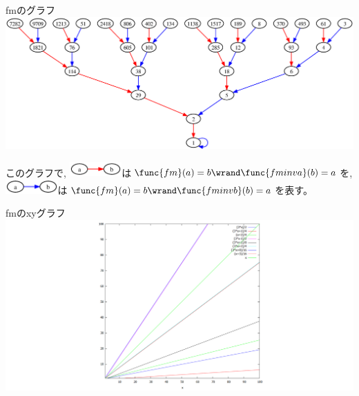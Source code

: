 \documentclass{mystyle}
\begin{document}
\begin{section}{fmのグラフ}
\includegraphics[width=.95\linewidth]{fmgraph.eps}\par\nobreak
このグラフで, \includegraphics[width=2cm]{fmgraphexample1.eps}は$\func{fm}(a)=b\wrand\func{fminva}(b)=a$を, \includegraphics[width=2cm]{fmgraphexample2.eps}は$\func{fm}(a)=b\wrand\func{fminvb}(b)=a$を表す。
\end{section}
%
\begin{section}{fmのxyグラフ}
\includegraphics[width=.95\linewidth]{m32xymap.png}
\end{section}
%
\end{document}
